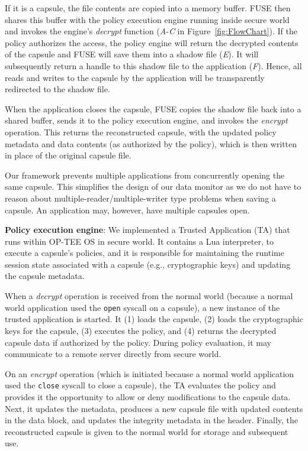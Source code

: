 If it is a capsule, the file contents are copied into a memory buffer. FUSE then
shares this buffer with the policy execution engine running inside secure world
and invokes the engine's {\em decrypt} function ({\em A}-{\em C} in
Figure~\ref{fig:FlowChart}). If the policy authorizes the access, the policy
engine will return the decrypted contents of the capsule and FUSE will save them
into a shadow file ({\em E}). It will subsequently return a handle to this
shadow file to the application ({\em F}). Hence, all reads and writes to the
capsule by the application will be transparently redirected to the shadow file.

When the application closes the capsule, FUSE copies the shadow file back into a
shared buffer, sends it to the policy execution engine, and invokes the {\em encrypt}
operation. This returns the reconstructed capsule, with the updated policy
metadata and data contents (as authorized by the policy), which is then written
in place of the original capsule file.

Our framework prevents multiple applications from concurrently opening the same
capsule. This simplifies the design of our data monitor as we do not have to
reason about multiple-reader/multiple-writer type problems when saving a
capsule. An application may, however, have multiple capsules open.

{\bf Policy execution engine}: We implemented a Trusted Application (TA) that
runs within OP-TEE OS in secure world. It contains a Lua interpreter, to execute
a capsule's policies, and it is responsible for maintaining the runtime session
state associated with a capsule (e.g., cryptographic keys) and updating the
capsule metadata.

When a {\em decrypt} operation is received from the normal world (because a
normal world application used the {\tt open} syscall on a capsule), a new
instance of the trusted application is started. It (1) loads the capsule, (2)
loads the cryptographic keys for the capsule, (3) executes the policy, and (4)
returns the decrypted capsule data if authorized by the policy. During policy
evaluation, it may communicate to a remote server directly from secure world.

On an {\em encrypt} operation (which is initiated because a normal world
application used the {\tt close} syscall to close a capsule), the TA evaluates
the policy and provides it the opportunity to allow or deny modifications to the
capsule data. Next, it updates the metadata, produces a new capsule file with
updated contents in the data block, and updates the integrity metadata in the
header. Finally, the reconstructed capsule is given to the normal world for
storage and subsequent use.


